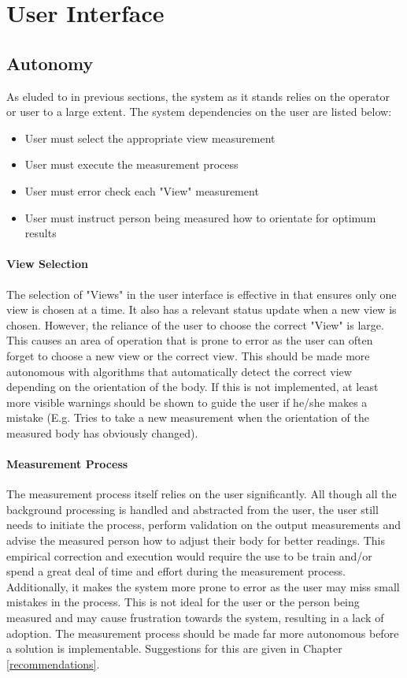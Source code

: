 \section{User Interface} \label{UIAnalysis}

\subsection{Autonomy}
As eluded to in previous sections, the system as it stands relies on the operator or user to a large extent. The system dependencies on the user are listed below:

\begin{itemize}
	\item User must select the appropriate view measurement
	\item User must execute the measurement process
	\item User must error check each "View" measurement
	\item User must instruct person being measured how to orientate for optimum results 
\end{itemize}

\paragraph{View Selection}
The selection of "Views" in the user interface is effective in that ensures only one view is chosen at a time. It also has a relevant status update when a new view is chosen. However, the reliance of the user to choose the correct "View" is large. This causes an area of operation that is prone to error as the user can often forget to choose a new view or the correct view. This should be made more autonomous with algorithms that automatically detect the correct view depending on the orientation of the body. If this is not implemented, at least more visible warnings should be shown to guide the user if he/she makes a mistake (E.g. Tries to take a new measurement when the orientation of the measured body has obviously changed).

\paragraph{Measurement Process}
The measurement process itself relies on the user significantly. All though all the background processing is handled and abstracted from the user, the user still needs to initiate the process, perform validation on the output measurements and advise the measured person how to adjust their body for better readings. This empirical correction and execution would require the use to be train and/or spend a great deal of time and effort during the measurement process. Additionally, it makes the system more prone to error as the user may miss small mistakes in the process. This is not ideal for the user or the person being measured and may cause frustration towards the system, resulting in a lack of adoption. The measurement process should be made far more autonomous before a solution is implementable. Suggestions for this are given in Chapter \ref{recommendations}.

